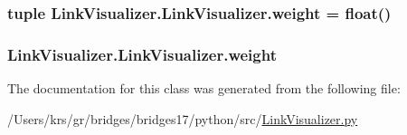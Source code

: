 \subsubsection[{weight}]{\setlength{\rightskip}{0pt plus 5cm}tuple Link\+Visualizer.\+Link\+Visualizer.\+weight = float()\hspace{0.3cm}{\ttfamily [static]}}\label{class_link_visualizer_1_1_link_visualizer_a2bcaeacc143bd2629d2fc7849b895bde}
\hypertarget{class_link_visualizer_1_1_link_visualizer_ab3663261fc964c75d45b76803384d933}{}
\subsubsection[{weight}]{\setlength{\rightskip}{0pt plus 5cm}Link\+Visualizer.\+Link\+Visualizer.\+weight}\label{class_link_visualizer_1_1_link_visualizer_ab3663261fc964c75d45b76803384d933}


The documentation for this class was generated from the following file\+:\begin{DoxyCompactItemize}
\item 
/\+Users/krs/gr/bridges/bridges17/python/src/\hyperlink{_link_visualizer_8py}{Link\+Visualizer.\+py}\end{DoxyCompactItemize}
